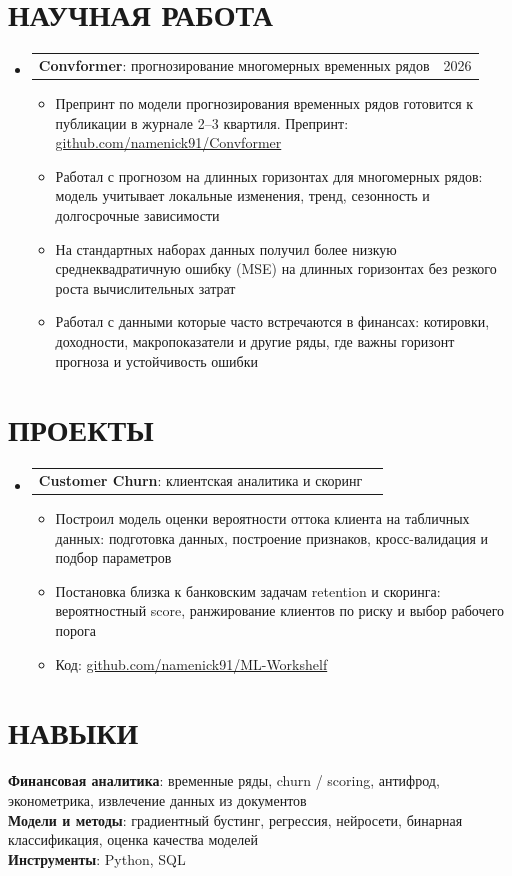 \documentclass[letterpaper,11pt]{article}
\makeatletter
\newcommand{\resumeItem}[1]{
  \item\small{
    {#1 \vspace{-1pt}}
  }
}
\newcommand{\resumeProjectHeading}[2]{
    \item
    \begin{tabular*}{\textwidth}{l@{\extracolsep{\fill}}r}
      #1 & {\color{dark-grey}\small #2} \\
    \end{tabular*}\vspace{-4pt}
}
\newcommand{\resumeSubHeadingListStart}{\begin{itemize}[leftmargin=0in, label={}]}
\newcommand{\resumeSubHeadingListEnd}{\end{itemize}}
\newcommand{\resumeItemListStart}{\begin{itemize}}
\newcommand{\resumeItemListEnd}{\end{itemize}\vspace{0pt}}
\makeatother
\begin{document}
\section{НАУЧНАЯ РАБОТА}
  \resumeSubHeadingListStart
    \resumeProjectHeading
      {\textbf{Convformer}: прогнозирование многомерных временных рядов}{2026}
      \resumeItemListStart
        \resumeItem{Препринт по модели прогнозирования временных рядов готовится к публикации в журнале 2--3 квартиля. Препринт: \href{https://github.com/namenick91/Convformer}{github.com/namenick91/Convformer}}
        \resumeItem{Работал с прогнозом на длинных горизонтах для многомерных рядов: модель учитывает локальные изменения, тренд, сезонность и долгосрочные зависимости}
        \resumeItem{На стандартных наборах данных получил более низкую среднеквадратичную ошибку (MSE) на длинных горизонтах без резкого роста вычислительных затрат}
        \resumeItem{Работал с данными которые часто встречаются в финансах: котировки, доходности, макропоказатели и другие ряды, где важны горизонт прогноза и устойчивость ошибки}
      \resumeItemListEnd
  \resumeSubHeadingListEnd


\section{ПРОЕКТЫ}
    \resumeSubHeadingListStart
      \resumeProjectHeading
          {\textbf{Customer Churn}: клиентская аналитика и скоринг}{}
          \resumeItemListStart
            \resumeItem{Построил модель оценки вероятности оттока клиента на табличных данных: подготовка данных, построение признаков, кросс-валидация и подбор параметров}
            \resumeItem{Постановка близка к банковским задачам retention и скоринга: вероятностный score, ранжирование клиентов по риску и выбор рабочего порога}
            \resumeItem{Код: \href{https://github.com/namenick91/ML-Workshelf\#customer-churn-prediction}{github.com/namenick91/ML-Workshelf}}
          \resumeItemListEnd
    \resumeSubHeadingListEnd


\section{НАВЫКИ}
 \begin{itemize}[leftmargin=0in, label={}]
    \small{\item{
     \textbf{Финансовая аналитика}{: временные ряды, churn / scoring, антифрод, эконометрика, извлечение данных из документов}\vspace{2pt} \\
     \textbf{Модели и методы}{: градиентный бустинг, регрессия, нейросети, бинарная классификация, оценка качества моделей}\vspace{2pt} \\
     \textbf{Инструменты}{: Python, SQL}
    }}
 \end{itemize}


\end{document}
